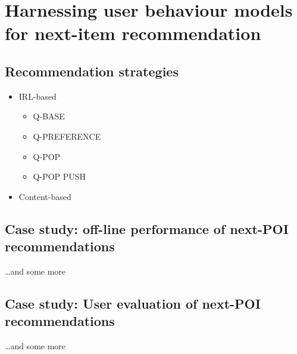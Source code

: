 \chapter{Harnessing user behaviour models for next-item recommendation}
\label{cha:recommendation}
\ifpdf
    \graphicspath{{Chapter5/Figs/Raster/}{Chapter5/Figs/PDF/}{Chapter5/Figs/}}
\else
    \graphicspath{{Chapter5/Figs/Vector/}{Chapter5/Figs/}}
\fi

\section{Recommendation strategies}
\begin{itemize}
\item IRL-based
\begin{itemize}
	\item Q-BASE
	\item Q-PREFERENCE
	\item Q-POP
	\item Q-POP PUSH
\end{itemize}
\item Content-based
\end{itemize}

\section{Case study: off-line performance of next-POI recommendations}
\dots and some more 

\section{Case study: User evaluation of next-POI recommendations}
\dots and some more 

